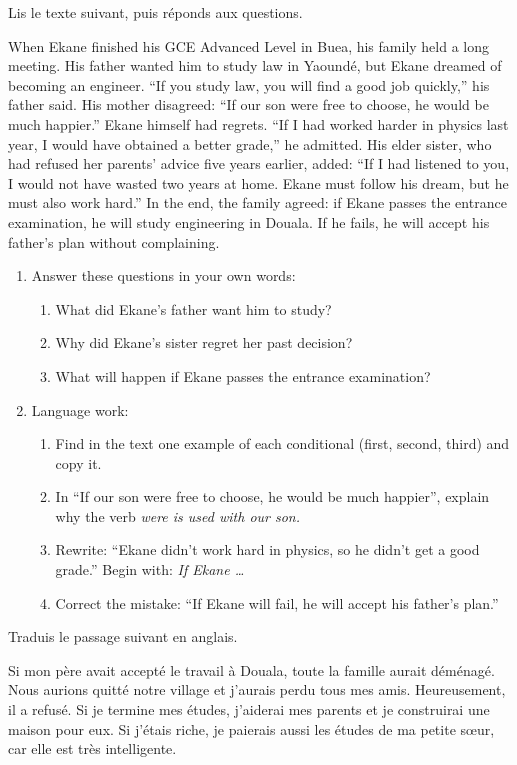 \documentclass[11pt]{article}
\newcommand{\eng}[1]{\ifmmode\text{\textit{#1}}\else\begingroup\selectlanguage{english}\itshape #1\endgroup\fi}
\begin{document}
\begin{exercice}
Lis le texte suivant, puis réponds aux questions.
\begin{textebox}
When Ekane finished his GCE Advanced Level in Buea, his family held a long meeting. His father wanted him to study law in Yaoundé, but Ekane dreamed of becoming an engineer. “If you study law, you will find a good job quickly,” his father said. His mother disagreed: “If our son were free to choose, he would be much happier.” Ekane himself had regrets. “If I had worked harder in physics last year, I would have obtained a better grade,” he admitted. His elder sister, who had refused her parents' advice five years earlier, added: “If I had listened to you, I would not have wasted two years at home. Ekane must follow his dream, but he must also work hard.” In the end, the family agreed: if Ekane passes the entrance examination, he will study engineering in Douala. If he fails, he will accept his father's plan without complaining.
\end{textebox}
\begin{enumerate}
\item Answer these questions in your own words:
\begin{enumerate}
\item What did Ekane's father want him to study?
\item Why did Ekane's sister regret her past decision?
\item What will happen if Ekane passes the entrance examination?
\end{enumerate}
\item Language work:
\begin{enumerate}
\item Find in the text one example of each conditional (first, second, third) and copy it.
\item In “If our son were free to choose, he would be much happier”, explain why the verb \eng{were} is used with \eng{our son}.
\item Rewrite: “Ekane didn't work hard in physics, so he didn't get a good grade.” Begin with: \emph{If Ekane \ldots}
\item Correct the mistake: “If Ekane will fail, he will accept his father's plan.”
\end{enumerate}
\end{enumerate}
\end{exercice}

\begin{exercice}
Traduis le passage suivant en anglais.
\begin{textebox}
Si mon père avait accepté le travail à Douala, toute la famille aurait déménagé. Nous aurions quitté notre village et j'aurais perdu tous mes amis. Heureusement, il a refusé. Si je termine mes études, j'aiderai mes parents et je construirai une maison pour eux. Si j'étais riche, je paierais aussi les études de ma petite sœur, car elle est très intelligente.
\end{textebox}
\end{exercice}
\end{document}
